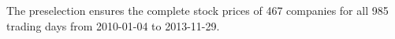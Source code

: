 The preselection ensures the complete stock prices of 467 companies for all 985 trading days from 2010-01-04 to 2013-11-29. %





